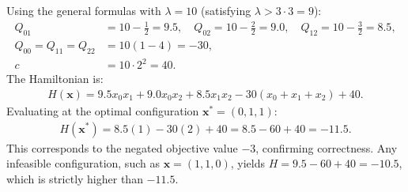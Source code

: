 \documentclass[12pt]{article}
\begin{document}
Using the general formulas with $\lambda = 10$ (satisfying $\lambda > 3 \cdot 3 = 9$):
\begin{align}
    Q_{01} &= 10 - \frac{1}{2} = 9.5, \quad Q_{02} = 10 - \frac{2}{2} = 9.0, \quad Q_{12} = 10 - \frac{3}{2} = 8.5, \\
    Q_{00} = Q_{11} = Q_{22} &= 10(1 - 4) = -30, \\
    c &= 10 \cdot 2^2 = 40.
\end{align}
The Hamiltonian is:
\begin{align}
    H(\mathbf{x}) = 9.5 x_0 x_1 + 9.0 x_0 x_2 + 8.5 x_1 x_2 - 30(x_0 + x_1 + x_2) + 40.
\end{align}
Evaluating at the optimal configuration $\mathbf{x}^* = (0, 1, 1)$:
\begin{align}
    H(\mathbf{x}^*) = 8.5(1) - 30(2) + 40 = 8.5 - 60 + 40 = -11.5.
\end{align}
This corresponds to the negated objective value $-3$, confirming correctness. Any infeasible configuration, such as $\mathbf{x} = (1, 1, 0)$, yields $H = 9.5 - 60 + 40 = -10.5$, which is strictly higher than $-11.5$.
\end{document}
